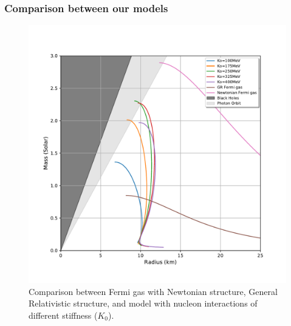 \documentclass[hperref={pdfpagelabels=false}]{beamer}
\begin{document}
\begin{frame}
 \frametitle{Comparison between our models}
 \begin{figure}
    \includegraphics[scale=0.3]{eos_compare_our_model.pdf}
    \caption{Comparison between Fermi gas with Newtonian structure, General Relativistic structure, and model with nucleon interactions of different stiffness ($K_{0}$).}\label{fig/ourmodel}
  \end{figure}
\end{frame}
\end{document}
